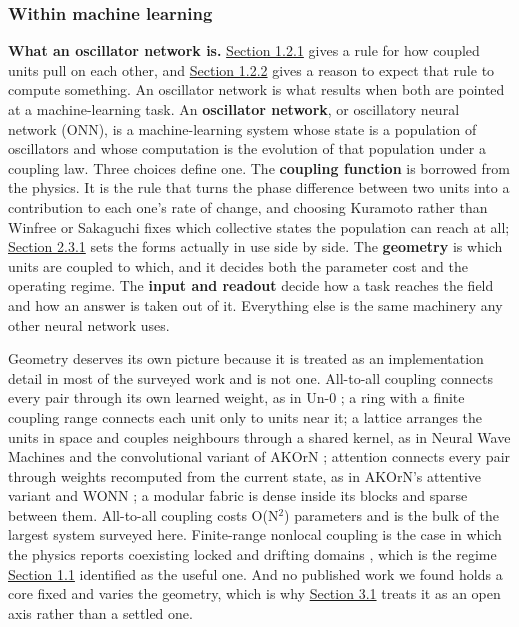 \documentclass[10pt]{article}
\begin{document}
\subsubsection{Within machine learning}\label{sec-1-2-3}

\textbf{What an oscillator network is.} \hyperref[sec-1-2-1]{Section
1.2.1} gives a rule for how coupled units pull on each other, and
\hyperref[sec-1-2-2]{Section 1.2.2} gives a reason to expect that rule
to compute something. An oscillator network is what results when both
are pointed at a machine-learning task. An \textbf{oscillator network},
or oscillatory neural network (ONN), is a machine-learning system whose
state is a population of oscillators and whose computation is the
evolution of that population under a coupling law. Three choices define
one. The \textbf{coupling function} is borrowed from the physics. It is
the rule that turns the phase difference between two units into a
contribution to each one's rate of change, and choosing Kuramoto rather
than Winfree or Sakaguchi fixes which collective states the population
can reach at all; \hyperref[sec-2-3-1]{Section 2.3.1} sets the forms
actually in use side by side. The \textbf{geometry} is which units are
coupled to which, and it decides both the parameter cost and the
operating regime. The \textbf{input and readout} decide how a task
reaches the field and how an answer is taken out of it. Everything else
is the same machinery any other neural network uses.

Geometry deserves its own picture because it is treated as an
implementation detail in most of the surveyed work and is not one.
All-to-all coupling connects every pair through its own learned weight,
as in Un-0 \citep{un-0}; a ring with a finite coupling range connects
each unit only to units near it; a lattice arranges the units in space
and couples neighbours through a shared kernel, as in Neural Wave
Machines \citep{keller2023} and the convolutional variant of AKOrN
\citep{akorn}; attention connects every pair through weights recomputed
from the current state, as in AKOrN's attentive variant and WONN
\citep{wonn}; a modular fabric is dense inside its blocks and sparse
between them. All-to-all coupling costs O(N\ensuremath{^{2}}) parameters
and is the bulk of the largest system surveyed here. Finite-range
nonlocal coupling is the case in which the physics reports coexisting
locked and drifting domains \citep{kuramoto2002}, which is the regime
\hyperref[sec-1-1]{Section 1.1} identified as the useful one. And no
published work we found holds a core fixed and varies the geometry,
which is why \hyperref[sec-3-1]{Section 3.1} treats it as an open axis
rather than a settled one.
\end{document}
